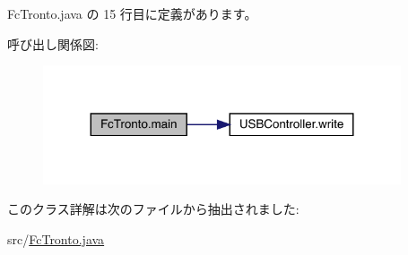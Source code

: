  Fc\+Tronto.\+java の 15 行目に定義があります。

呼び出し関係図\+:
\nopagebreak
\begin{figure}[H]
\begin{center}
\leavevmode
\includegraphics[width=299pt]{d0/d50/class_fc_tronto_a3e0328e996d4755d3624e9217c5848dc_cgraph}
\end{center}
\end{figure}


このクラス詳解は次のファイルから抽出されました\+:\begin{DoxyCompactItemize}
\item 
src/\mbox{\hyperlink{_fc_tronto_8java}{Fc\+Tronto.\+java}}\end{DoxyCompactItemize}

